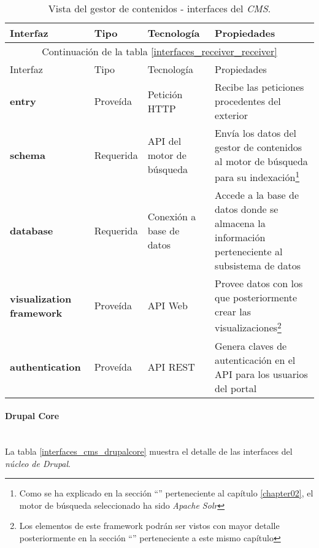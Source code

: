 \begin{longtable}[c]{|p{25mm}|p{20mm}|p{30mm}|p{60mm}|}
 \caption{Vista del gestor de contenidos - interfaces del \textit{CMS}.\label{interfaces_cms_cms}}\\

 \hline
 	Interfaz & Tipo & Tecnología & Propiedades\\
 \hline
 \hline
 \endfirsthead
 \hline
 \multicolumn{4}{|c|}{Continuación de la tabla \ref{interfaces_receiver_receiver}}\\
 \hline
 	Interfaz & Tipo & Tecnología & Propiedades\\
 \hline
 \hline
 \endhead
 \hline
 \endfoot
 
	\textbf{entry} & Proveída & Petición HTTP & Recibe las peticiones procedentes del exterior \\
	\hline
		
	\textbf{schema} & Requerida & API del motor de búsqueda & Envía los datos del gestor de contenidos al motor de búsqueda para su indexación\footnote{ Como se ha explicado en la sección ``\nameref{chapter02:alternativas_seleccionadas}'' perteneciente al capítulo \ref{chapter02}, el motor de búsqueda seleccionado ha sido \textit{Apache Solr}} \\
	\hline
	
	\textbf{database} & Requerida & Conexión a base de datos & Accede a la base de datos donde se almacena la información perteneciente al subsistema de datos \\
	\hline
	
	\textbf{visualization framework} & Proveída & API Web & Provee datos con los que posteriormente crear las visualizaciones\footnote{Los elementos de este framework podrán ser vistos con mayor detalle posteriormente en la sección ``\nameref{vista_landportal_uris}'' perteneciente a este mismo capítulo} \\
	\hline
	
	\textbf{authentication} & Proveída & API REST & Genera claves de autenticación en el API para los usuarios del portal \\
\hline
\hline

 \end{longtable}


\paragraph{Drupal Core} \hfill \\
La tabla \ref{interfaces_cms_drupalcore} muestra el detalle de las interfaces del \textit{núcleo de Drupal}.  

